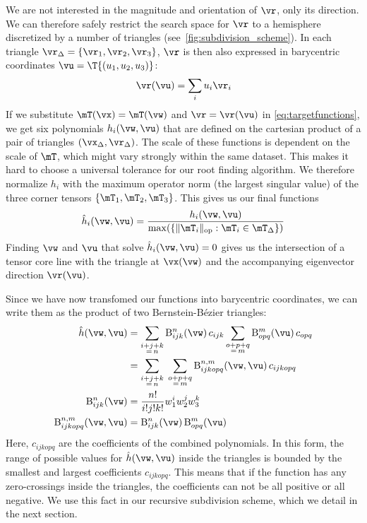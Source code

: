 %
We are not interested in the magnitude and orientation of $\vr$, only its
direction.
%
We can therefore safely restrict the search space for $\vr$ to a hemisphere
discretized by a number of triangles (see~\cref{fig:subdivision_scheme}).
%
In each triangle $\vr_\Delta = \{\vr_1, \vr_2, \vr_3\}$, $\vr$ is then also
expressed in barycentric coordinates $\vu = \T{(u_1, u_2, u_3)}$:
%
\begin{equation}
  \vr(\vu) = \sum_i u_i \vr_i
\end{equation}
%
If we substitute $\mT(\vx) = \mT(\vw)$ and $\vr = \vr(\vu)$ in
\eqref{eq:targetfunctions}, we get six polynomials $h_i(\vw, \vu)$
that are defined on the cartesian product of a pair of triangles
$(\vx_\Delta, \vr_\Delta)$.
%
The scale of these functions is dependent on the scale of $\mT$, which might
vary strongly within the same dataset.
%
This makes it hard to choose a universal tolerance for our root finding
algorithm.
%
We therefore normalize $h_i$ with the maximum operator norm (the largest
singular value) of the three corner tensors $\{\mT_1, \mT_2, \mT_3\}$.
%
This gives us our final functions
%
\begin{equation}
  \hat{h}_i(\vw, \vu) = \frac{h_i(\vw, \vu)}
      {\max(\{\|\mT_i\|_{\mathrm{op}} : \mT_i \in \mT_\Delta\})}
\end{equation}
%
Finding $\vw$ and $\vu$ that solve $\hat{h}_i(\vw, \vu) = 0$ gives us the
intersection of a tensor core line with the triangle at $\vx(\vw)$ and the
accompanying eigenvector direction $\vr(\vu)$.
%

%
Since we have now transfomed our functions into barycentric coordinates, we can
write them as the product of two Bernstein-B\'ezier triangles:
%
\begin{align}
\hat{h}(\vw, \vu) &= \sum_{\substack{i+j+k\\=\,n}} \mathrm{B}_{ijk}^n(\vw)\, c_{ijk}
                \sum_{\substack{o+p+q\\=\,m}} \mathrm{B}_{opq}^m(\vu)\, c_{opq} \\
            &= \sum_{\substack{i+j+k\\=\,n}} \; \sum_{\substack{o+p+q\\=\,m}}
              \mathrm{B}_{ijkopq}^{n, m}(\vw, \vu)\, c_{ijkopq} \\
\mathrm{B}_{ijk}^n(\vw) &= \frac{n!}{i!j!k!} w_1^i w_2^j w_3^k \\
\mathrm{B}_{ijkopq}^{n, m}(\vw, \vu) &= \mathrm{B}_{ijk}^n(\vw) \, \mathrm{B}_{opq}^m(\vu)
\end{align}
%
Here, $c_{ijkopq}$ are the coefficients of the combined polynomials.
%
In this form, the range of possible values for $\hat{h}(\vw, \vu)$ inside the
triangles is bounded by the smallest and largest coefficients $c_{ijkopq}$.
%
This means that if the function has any zero-crossings inside the triangles,
the coefficients can not be all positive or all negative.
%
We use this fact in our recursive subdivision scheme, which we detail in the
next section.
% 

